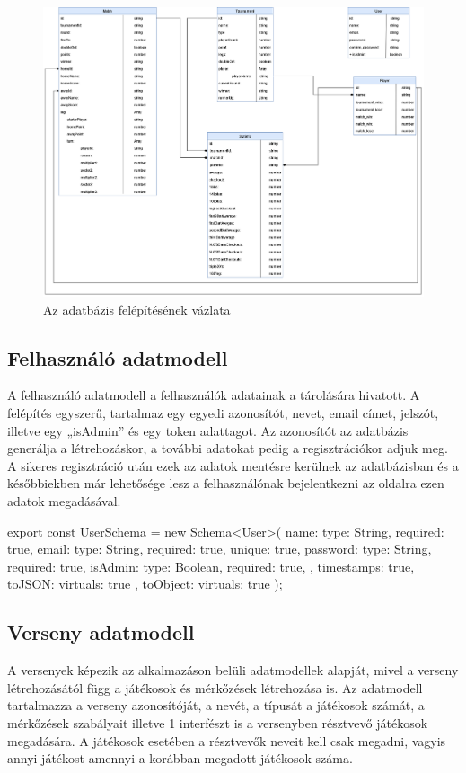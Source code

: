 \begin{figure}[h]
\centering
\includegraphics[scale=0.3]{images/DoubleOut_NewClass.drawio(1).png}
\caption{Az adatbázis felépítésének vázlata}
\label{fig:cimer}
\end{figure}

\subsection{Felhasználó adatmodell}
A felhasználó adatmodell a felhasználók adatainak a tárolására hivatott. A felépítés egyszerű, tartalmaz egy egyedi azonosítót, nevet, email címet, jelszót, illetve egy „isAdmin” és egy token adattagot. Az azonosítót az adatbázis generálja a létrehozáskor, a további adatokat pedig a regisztrációkor adjuk meg. A sikeres regisztráció után ezek az adatok mentésre kerülnek az adatbázisban és a későbbiekben már lehetősége lesz a felhasználónak bejelentkezni az oldalra ezen adatok megadásával.

\begin{cpp}
export const UserSchema = new Schema<User>({
    name: {type: String, required: true},
    email: {type: String, required: true, unique: true},
    password: {type: String, required: true},
    isAdmin: {type: Boolean, required: true},
}, {
    timestamps: true,
    toJSON:{
        virtuals: true
    },
    toObject:{
        virtuals: true
    }
});
\end{cpp}

\subsection{Verseny adatmodell}
A versenyek képezik az alkalmazáson belüli adatmodellek alapját, mivel a verseny létrehozásától függ a játékosok és mérkőzések létrehozása is. Az adatmodell tartalmazza a verseny azonosítóját, a nevét, a típusát a játékosok számát, a mérkőzések szabályait illetve 1 interfészt is a versenyben résztvevő játékosok megadására. A játékosok esetében a résztvevők neveit kell csak megadni, vagyis annyi játékost amennyi a korábban megadott játékosok száma.

